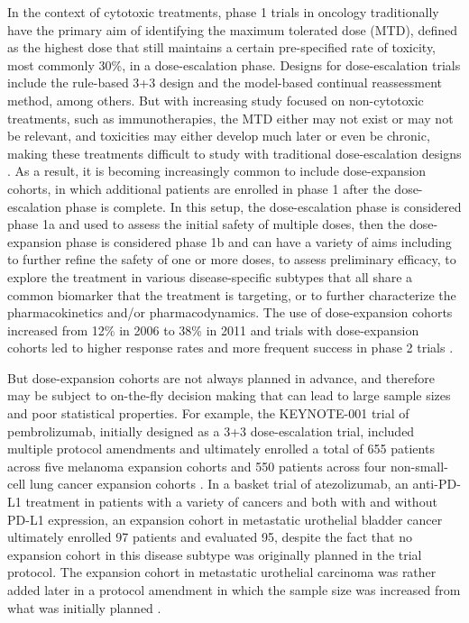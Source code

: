 In the context of cytotoxic treatments, phase 1 trials in oncology
traditionally have the primary aim of identifying the maximum tolerated
dose (MTD), defined as the highest dose that still maintains a certain
pre-specified rate of toxicity, most commonly 30\%, in a dose-escalation
phase. Designs for dose-escalation trials include the rule-based 3+3
design and the model-based continual reassessment method, among others.
But with increasing study focused on non-cytotoxic treatments, such as
immunotherapies, the MTD either may not exist or may not be relevant,
and toxicities may either develop much later or even be chronic, making
these treatments difficult to study with traditional dose-escalation
designs \citep{Pestana2020}. As a result, it is becoming increasingly
common to include dose-expansion cohorts, in which additional patients
are enrolled in phase 1 after the dose-escalation phase is complete. In
this setup, the dose-escalation phase is considered phase 1a and used to
assess the initial safety of multiple doses, then the dose-expansion
phase is considered phase 1b and can have a variety of aims including to
further refine the safety of one or more doses, to assess preliminary
efficacy, to explore the treatment in various disease-specific subtypes
that all share a common biomarker that the treatment is targeting, or to
further characterize the pharmacokinetics and/or pharmacodynamics. The
use of dose-expansion cohorts increased from 12\% in 2006 to 38\% in
2011 \citep{Manji2013} and trials with dose-expansion cohorts led to
higher response rates and more frequent success in phase 2 trials
\citep{Bugano2017}.

But dose-expansion cohorts are not always planned in advance, and
therefore may be subject to on-the-fly decision making that can lead to
large sample sizes and poor statistical properties. For example, the
KEYNOTE-001 trial of pembrolizumab, initially designed as a 3+3
dose-escalation trial, included multiple protocol amendments and
ultimately enrolled a total of 655 patients across five melanoma
expansion cohorts and 550 patients across four non-small-cell lung
cancer expansion cohorts \citep{Khoja2015}. In a basket trial of
atezolizumab, an anti-PD-L1 treatment in patients with a variety of
cancers and both with and without PD-L1 expression, an expansion cohort
in metastatic urothelial bladder cancer ultimately enrolled 97 patients
and evaluated 95, despite the fact that no expansion cohort in this
disease subtype was originally planned in the trial protocol. The
expansion cohort in metastatic urothelial carcinoma was rather added
later in a protocol amendment in which the sample size was increased
from what was initially planned \citep{Petrylak2018, Powles2014}.

